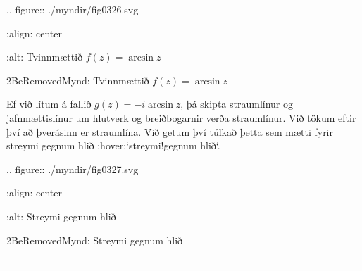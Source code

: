 .. figure:: ./myndir/fig0326.svg

    :align: center

    :alt:  Tvinnmættið $f(z)=\arcsin z$

    2BeRemovedMynd:  Tvinnmættið $f(z)=\arcsin z$
 


Ef við lítum á fallið $g(z)=-i\arcsin z$, þá skipta straumlínur og
jafnmættislínur um hlutverk og breiðbogarnir verða straumlínur.  Við
tökum eftir því að þverásinn er straumlína.  Við getum því túlkað þetta
sem mætti fyrir streymi gegnum hlið :hover:`streymi!gegnum hlið`.



.. figure:: ./myndir/fig0327.svg

    :align: center

    :alt:  Streymi gegnum hlið

    2BeRemovedMynd:  Streymi gegnum hlið



--------------




